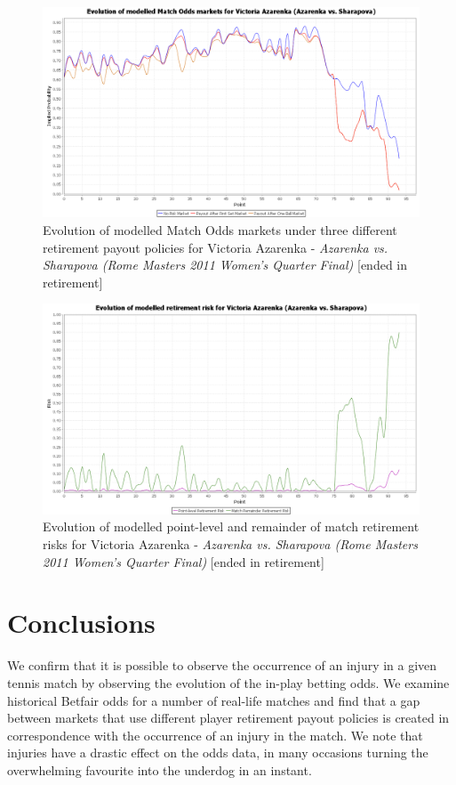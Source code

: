 \documentclass[letterpaper,12pt]{article}
\begin{document}
\begin{figure}[H]
  \centering \includegraphics[width=12.3cm]{matches/azarenkasharapovamodel}
  \caption{Evolution of modelled Match Odds markets under three different retirement payout policies for Victoria Azarenka - \textit{Azarenka vs. Sharapova (Rome Masters 2011 Women's Quarter Final)} [ended in retirement]}
  \label{azarenkasharapovamodel}
\end{figure}

\begin{figure}[H]
  \centering \includegraphics[width=12.3cm]{matches/azarenkasharapovarisk}
  \caption{Evolution of modelled point-level and remainder of match retirement risks for Victoria Azarenka - \textit{Azarenka vs. Sharapova (Rome Masters 2011 Women's Quarter Final)} [ended in retirement]}
  \label{azarenkasharapovarisk}
\end{figure}

\section{Conclusions}

We confirm that it is possible to observe the occurrence of an injury in a given tennis match by observing the evolution of the in-play betting odds.  We examine historical Betfair odds for a number of real-life matches and find that a gap between markets that use different player retirement payout policies is created in correspondence with the occurrence of an injury in the match.  We note that injuries have a drastic effect on the odds data, in many occasions turning the overwhelming favourite into the underdog in an instant.
\end{document}
